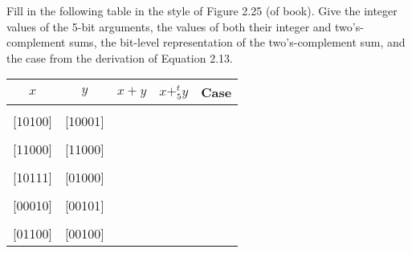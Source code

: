 \documentclass[12pt]{article}
\newenvironment{ex}[2][Exercise]{\begin{trivlist}
		\item[\hskip \labelsep {\bfseries #1}\hskip \labelsep {\bfseries #2.}]}{\end{trivlist}}
\begin{document}
\begin{ex}{2.29}
	Fill in the following table in the style of Figure 2.25 (of book). Give the integer values
	of the 5-bit arguments, the values of both their integer and two's-complement sums,
	the bit-level representation of the two's-complement sum, and the case from the
	derivation of Equation 2.13.
	\begin{center}
		\begin{tabular}{ccccc}
			$x$ & $y$ & $x+y$ & $x+^t_5y$ & Case\\
			\hline
			\makebox[1cm]{\hrulefill} & \makebox[1cm]{\hrulefill} & \makebox[1cm]{\hrulefill} & \makebox[1cm]{\hrulefill} & \makebox[1cm]{\hrulefill}\\
			
			[10100] & [10001] & \makebox[1cm]{\hrulefill} & \makebox[1cm]{\hrulefill} \\
			
			\makebox[1cm]{\hrulefill} & \makebox[1cm]{\hrulefill} & \makebox[1cm]{\hrulefill} & \makebox[1cm]{\hrulefill} & \makebox[1cm]{\hrulefill}\\
			
			[11000] & [11000] & \makebox[1cm]{\hrulefill} & \makebox[1cm]{\hrulefill} \\
			
			\makebox[1cm]{\hrulefill} & \makebox[1cm]{\hrulefill} & \makebox[1cm]{\hrulefill} & \makebox[1cm]{\hrulefill} & \makebox[1cm]{\hrulefill}\\
			
			[10111] & [01000] & \makebox[1cm]{\hrulefill} & \makebox[1cm]{\hrulefill} \\
			
			\makebox[1cm]{\hrulefill} & \makebox[1cm]{\hrulefill} & \makebox[1cm]{\hrulefill} & \makebox[1cm]{\hrulefill} & \makebox[1cm]{\hrulefill}\\
			
			[00010] & [00101] & \makebox[1cm]{\hrulefill} & \makebox[1cm]{\hrulefill} \\
			
			\makebox[1cm]{\hrulefill} & \makebox[1cm]{\hrulefill} & \makebox[1cm]{\hrulefill} & \makebox[1cm]{\hrulefill} & \makebox[1cm]{\hrulefill}\\
			
			[01100] & [00100] & \makebox[1cm]{\hrulefill} & \makebox[1cm]{\hrulefill} 
		\end{tabular}
	\end{center}
\end{ex}
\end{document}
